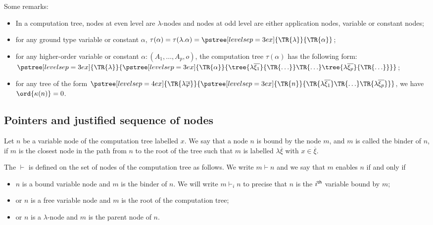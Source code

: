 \noindent Some remarks:
\begin{itemize}
\item In a computation tree, nodes at even level are $\lambda$-nodes and nodes at odd level are either application nodes,
variable or constant nodes;

\item for any ground type variable or constant $\alpha$,
$\tau(\alpha) = \tau(\lambda . \alpha) =  \pstree[levelsep=3ex]
    { \TR{\lambda } }
    { \TR{\alpha}
    }$;

\item for any higher-order variable or constant $\alpha : (A_1,\ldots,A_p,o)$, the computation tree $\tau(\alpha)$ has the following form:
$ \pstree[levelsep=3ex]{\TR{\lambda}}
        {\pstree[levelsep=3ex]
                { \TR{\alpha} }
                { \tree{\lambda \overline{\xi_1}}{\TR{\ldots}} \TR{\ldots} \tree{\lambda \overline{\xi_p}}{\TR{\ldots}}
                }
        }
$;

\item for any tree of the form
        $ \pstree[levelsep=4ex]
            { \TR{\lambda \overline{\varphi}} }
            { \pstree[levelsep=3ex]
                {\TR{n}}
                {\TR{\lambda \overline{\xi_1}} \TR{\ldots} \TR{\lambda \overline{\xi_p}}}
            }
        $,
    we have $\ord{\kappa(n)}=0$.

\end{itemize}



\subsection{Pointers and justified sequence of nodes}

\begin{definition}[Binder]
Let $n$ be a variable node of the computation tree labelled $x$. We
say that a node $n$ is bound by the node $m$, and $m$ is called the
binder of $n$, if $m$ is the closest node in the path from $n$ to
the root of the tree such that $m$ is labelled $\lambda
\overline{\xi}$ with $x\in \overline{\xi}$.
\end{definition}

\begin{definition}[Enabling]
The  $\vdash$ is defined on the set of
nodes of the computation tree as follows. We write $m \vdash n$ and
we say that $m$ enables $n$ if and only if
\begin{itemize}
\item $n$ is a bound variable node and $m$ is the binder of $n$. We will write $m \vdash_i n$ to precise that $n$
is the $i^{\sf th}$ variable bound by $m$;
\item or $n$ is a free variable node and $m$ is the root of the computation
tree;
\item or $n$ is a $\lambda$-node and $m$ is the parent node of $n$.
\end{itemize}
\end{definition}


